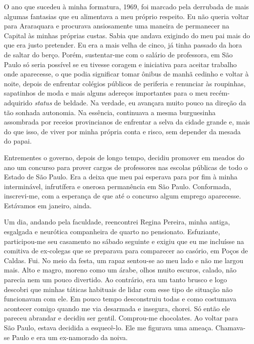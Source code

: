 O ano que sucedeu à minha formatura, 1969, foi marcado pela derrubada de mais algumas fantasias que eu alimentava a meu próprio respeito.
Eu não queria voltar para Araraquara e procurava ansiosamente uma maneira de permanecer na Capital às minhas próprias custas.
Sabia que andava exigindo do meu pai mais do que era justo pretender.
Eu era a mais velha de cinco, já tinha passado da hora de saltar do berço.
Porém, sustentar-me com o salário de professora, em São Paulo só seria possível se eu tivesse coragem e iniciativa para aceitar trabalho onde aparecesse, o que podia significar tomar ônibus de manhã cedinho e voltar à noite, depois de enfrentar colégios públicos de periferia e renunciar às roupinhas, sapatinhos de moda e mais alguns adereços importantes para o meu recém-adquirido \textit{status} de beldade.
Na verdade, eu avançara muito pouco na direção da tão sonhada autonomia.
Na essência, continuava a mesma burguesinha assombrada por receios provincianos de enfrentar a selva da cidade grande e, mais do que isso, de viver por minha própria conta e risco, sem depender da mesada do papai.


Entrementes o governo, depois de longo tempo, decidiu promover em meados do ano um concurso para prover cargos de professores nas escolas públicas de todo o Estado de São Paulo.
Era a deixa que meu pai esperava para por fim à minha interminável, infrutífera e onerosa permanência em São Paulo.
Conformada, inscrevi-me, com a esperança de que até o concurso algum emprego aparecesse.
Estávamos em janeiro, ainda.

Um dia, andando pela faculdade, reencontrei Regina Pereira, minha antiga, esgalgada e neurótica companheira de quarto no pensionato.
Esfuziante, participou-me seu casamento no sábado seguinte e exigiu que eu me incluísse na comitiva de ex-colegas que se preparava para comparecer ao casório, em Poços de Caldas.
Fui.
No meio da festa, um rapaz sentou-se ao meu lado e não me largou mais.
Alto e magro, moreno como um árabe, olhos muito escuros, calado, não parecia nem um pouco divertido.
Ao contrário, era um tanto brusco e logo descobri que minhas táticas habituais de lidar com esse tipo de situação não funcionavam com ele.
Em pouco tempo desconstruiu todas e como costumava acontecer comigo quando me via desarmada e insegura, chorei.
Só então ele pareceu abrandar e decidiu ser gentil.
Comprou-me chocolates.
Ao voltar para São Paulo, estava decidida a esquecê-lo.
Ele me figurava uma ameaça.
Chamava-se Paulo e era um ex-namorado da noiva.
 
